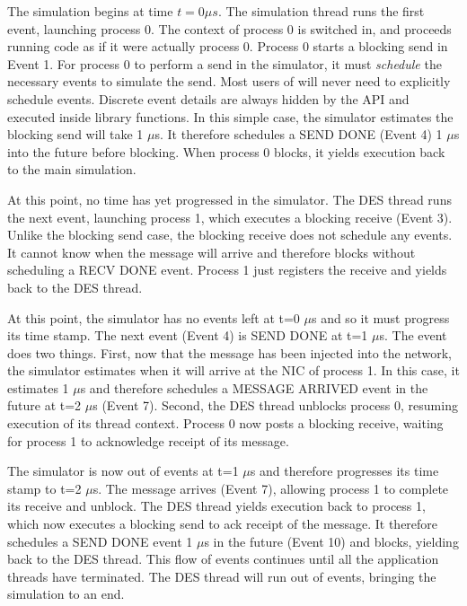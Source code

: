 The simulation begins at time $t=0\mu s$.
The simulation thread runs the first event, launching process 0.
The context of process 0 is switched in, and \sstmacro proceeds running code as if it were actually process 0.
Process 0 starts a blocking send in Event 1.
For process 0 to perform a send in the simulator, it must \emph{schedule} the necessary events to simulate the send.
Most users of \sstmacro will never need to explicitly schedule events.
Discrete event details are always hidden by the API and executed inside library functions.
In this simple case, the simulator estimates the blocking send will take 1 $\mu$s.
It therefore schedules a SEND DONE (Event 4) 1 $\mu$s into the future before blocking.
When process 0 blocks, it yields execution back to the main simulation.

At this point, no time has yet progressed in the simulator.
The DES thread runs the next event, launching process 1, which executes a blocking receive (Event 3).
Unlike the blocking send case, the blocking receive does not schedule any events.
It cannot know when the message will arrive and therefore blocks without scheduling a RECV DONE event.
Process 1 just registers the receive and yields back to the DES thread.

At this point, the simulator has no events left at t=0 $\mu$s and so it must progress its time stamp.
The next event (Event 4) is SEND DONE at t=1 $\mu$s. The event does two things.
First, now that the message has been injected into the network, the simulator estimates when it will arrive at the NIC of process 1.
In this case, it estimates 1 $\mu$s and therefore schedules a MESSAGE ARRIVED event in the future at t=2 $\mu$s (Event 7).
Second, the DES thread unblocks process 0, resuming execution of its thread context.
Process 0 now posts a blocking receive, waiting for process 1 to acknowledge receipt of its message.

The simulator is now out of events at t=1 $\mu$s and therefore progresses its time stamp to t=2 $\mu$s.
The message arrives (Event 7), allowing process 1 to complete its receive and unblock.
The DES thread yields execution back to process 1, which now executes a blocking send to ack receipt of the message.
It therefore schedules a SEND DONE event 1 $\mu$s in the future (Event 10) and blocks, yielding back to the DES thread.
This flow of events continues until all the application threads have terminated.
The DES thread will run out of events, bringing the simulation to an end. 


